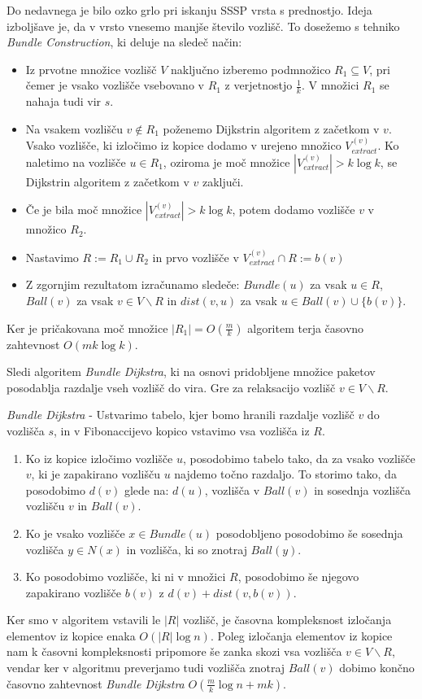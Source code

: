 \documentclass{article}
\begin{document}
Do nedavnega je bilo ozko grlo pri iskanju SSSP vrsta s prednostjo. Ideja izboljšave je, da v vrsto vnesemo manjše število vozlišč. To dosežemo s tehniko \textit{Bundle Construction}, ki deluje na sledeč način:
\begin{itemize}
  \item Iz prvotne množice vozlišč $V$ naključno izberemo podmnožico $R_1 \subseteq V$, pri čemer je vsako vozlišče vsebovano v $R_1$ z verjetnostjo $\frac{1}{k}$. V množici $R_1$ se nahaja tudi vir $s$.
  \item Na vsakem vozlišču $v \notin R_1$ poženemo Dijkstrin algoritem z začetkom v $v$.
  Vsako vozlišče, ki izločimo iz kopice dodamo v urejeno množico $V_{extract}^{(v)}$. Ko naletimo na vozlišče $u \in R_1$, oziroma je moč množice $|V_{extract}^{(v)}| > k \log k$, se Dijkstrin algoritem z začetkom v $v$ zaključi.
  \item Če je bila moč množice $|V_{extract}^{(v)}| > k \log k$, potem dodamo vozlišče $v$ v množico $R_2$.
  \item Nastavimo $R := R_1 \cup R_2$ in prvo vozlišče v $V_{extract}^{(v)} \cap R := b(v)$ 
  \item Z zgornjim rezultatom izračunamo sledeče: $Bundle(u)$ za vsak $u \in R$, $Ball(v)$ za vsak $v \in V \backslash R$ in $dist(v,u)$ za vsak $u \in Ball(v) \cup \{b(v)\}$.
\end{itemize}

Ker je pričakovana moč množice $|R_1| = O(\frac{m}{k})$ algoritem terja časovno zahtevnost $O(mk \log k)$. %

Sledi algoritem \textit{Bundle Dijkstra}, ki na osnovi pridobljene množice paketov posodablja razdalje vseh vozlišč do vira. Gre za relaksacijo vozlišč $v \in V \backslash R$.

\textit{Bundle Dijkstra} - Ustvarimo tabelo, kjer bomo hranili razdalje vozlišč $v$ do vozlišča $s$, in v Fibonaccijevo kopico vstavimo vsa vozlišča iz $R$.
\begin{enumerate}
  \item
  Ko iz kopice izločimo vozlišče $u$, posodobimo tabelo tako, da za vsako vozlišče $v$, ki je zapakirano vozlišču $u$ najdemo točno razdaljo. To storimo tako, da %
  posodobimo $d(v)$ glede na: $d(u)$, vozlišča v $Ball(v)$ in sosednja vozlišča vozlišču $v$ in $Ball(v)$.
  \item
  Ko je vsako vozlišče $x \in Bundle(u)$ posodobljeno posodobimo še sosednja vozlišča $y \in N(x)$ in vozlišča, ki so znotraj $Ball(y)$.
  \item
  Ko posodobimo vozlišče, ki ni v množici $R$, posodobimo še njegovo zapakirano vozlišče $b(v)$ z $d(v) + dist(v,b(v))$.
\end{enumerate}
Ker smo v algoritem vstavili le $|R|$ vozlišč, je časovna kompleksnost izločanja elementov iz kopice enaka $O(|R|\log n)$. Poleg izločanja elementov iz kopice nam k časovni kompleksnosti pripomore še zanka skozi vsa vozlišča ${v} \in V \backslash R$, vendar ker v algoritmu preverjamo tudi vozlišča znotraj $Ball(v)$ dobimo končno časovno zahtevnost \textit{Bundle Dijkstra} $O(\frac{m}{k}\log n + mk)$.
\end{document}
